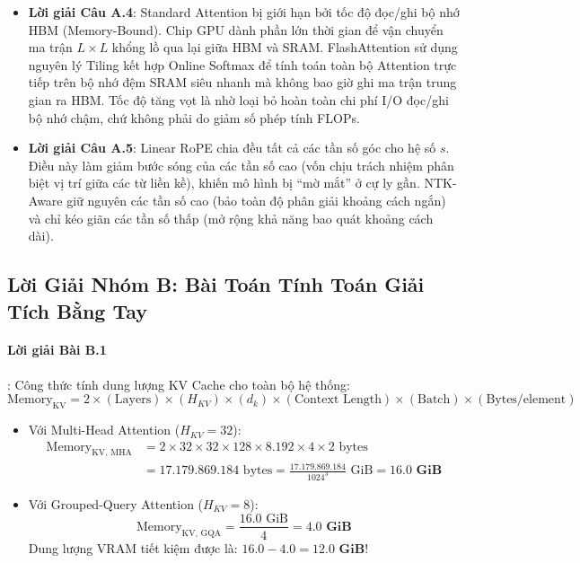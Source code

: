 \begin{itemize}
  \item \textbf{Lời giải Câu A.4}:
  Standard Attention bị giới hạn bởi tốc độ đọc/ghi bộ nhớ HBM (Memory-Bound). Chip GPU dành phần lớn thời gian để vận chuyển ma trận $L \times L$ khổng lồ qua lại giữa HBM và SRAM. FlashAttention sử dụng nguyên lý Tiling kết hợp Online Softmax để tính toán toàn bộ Attention trực tiếp trên bộ nhớ đệm SRAM siêu nhanh mà không bao giờ ghi ma trận trung gian ra HBM. Tốc độ tăng vọt là nhờ loại bỏ hoàn toàn chi phí I/O đọc/ghi bộ nhớ chậm, chứ không phải do giảm số phép tính FLOPs.

  \item \textbf{Lời giải Câu A.5}:
  Linear RoPE chia đều tất cả các tần số góc cho hệ số $s$. Điều này làm giảm bước sóng của các tần số cao (vốn chịu trách nhiệm phân biệt vị trí giữa các từ liền kề), khiến mô hình bị ``mờ mắt'' ở cự ly gần. NTK-Aware giữ nguyên các tần số cao (bảo toàn độ phân giải khoảng cách ngắn) và chỉ kéo giãn các tần số thấp (mở rộng khả năng bao quát khoảng cách dài).
\end{itemize}

\subsection{Lời Giải Nhóm B: Bài Toán Tính Toán Giải Tích Bằng Tay}

\paragraph{Lời giải Bài B.1}:
Công thức tính dung lượng KV Cache cho toàn bộ hệ thống:
\begin{equation*}
\text{Memory}_{\text{KV}} = 2 \times (\text{Layers}) \times (H_{KV}) \times (d_k) \times (\text{Context Length}) \times (\text{Batch}) \times (\text{Bytes/element})
\end{equation*}
\begin{itemize}
  \item[a)] Với Multi-Head Attention ($H_{KV} = 32$):
  \begin{align*}
  \text{Memory}_{\text{KV, MHA}} &= 2 \times 32 \times 32 \times 128 \times 8.192 \times 4 \times 2\text{ bytes} \\
  &= 17.179.869.184\text{ bytes} = \frac{17.179.869.184}{1024^3}\text{ GiB} = \mathbf{16.0\text{ GiB}}
  \end{align*}
  \item[b)] Với Grouped-Query Attention ($H_{KV} = 8$):
  \begin{equation*}
  \text{Memory}_{\text{KV, GQA}} = \frac{16.0\text{ GiB}}{4} = \mathbf{4.0\text{ GiB}}
  \end{equation*}
  Dung lượng VRAM tiết kiệm được là: $16.0 - 4.0 = \mathbf{12.0\text{ GiB}}$!
\end{itemize}

